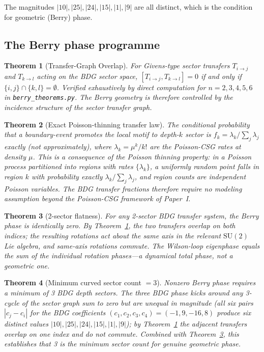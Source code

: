 \documentclass[11pt]{article}
\newtheorem{theorem}{Theorem}
\begin{document}
The magnitudes $|10|,|25|,|24|,|15|,|1|,|9|$ are all distinct, which is the condition for geometric (Berry) phase.

\subsection{The Berry phase programme}

\begin{theorem}[Transfer-Graph Overlap]
\label{thm:overlap}
For Givens-type sector transfers $T_{i\to j}$ and $T_{k\to l}$ acting on the BDG sector space, $[T_{i\to j},T_{k\to l}]=0$ if and only if $\{i,j\}\cap\{k,l\}=\emptyset$. Verified exhaustively by direct computation for $n=2,3,4,5,6$ in \texttt{berry\_theorems.py}. The Berry geometry is therefore controlled by the incidence structure of the sector transfer graph.
\end{theorem}

\begin{theorem}[Exact Poisson-thinning transfer law]
\label{thm:thinning}
The conditional probability that a boundary-event promotes the local motif to depth-$k$ sector is $f_k=\lambda_k/\sum_j\lambda_j$ exactly (not approximately), where $\lambda_k=\mu^k/k!$ are the Poisson-CSG rates at density $\mu$. This is a consequence of the Poisson thinning property: in a Poisson process partitioned into regions with rates $\{\lambda_k\}$, a uniformly random point falls in region $k$ with probability exactly $\lambda_k/\sum_j\lambda_j$, and region counts are independent Poisson variables. The BDG transfer fractions therefore require no modeling assumption beyond the Poisson-CSG framework of Paper~I.
\end{theorem}

\begin{theorem}[2-sector flatness]
\label{thm:2sector}
For any 2-sector BDG transfer system, the Berry phase is identically zero. By Theorem~\ref{thm:overlap}, the two transfers overlap on both indices; the resulting rotations act about the same axis in the relevant $\mathrm{SU}(2)$ Lie algebra, and same-axis rotations commute. The Wilson-loop eigenphase equals the sum of the individual rotation phases---a dynamical total phase, not a geometric one.
\end{theorem}

\begin{theorem}[Minimum curved sector count $=3$]
\label{thm:min3}
Nonzero Berry phase requires a minimum of 3 BDG depth sectors. The three BDG phase kicks around any 3-cycle of the sector graph sum to zero but are unequal in magnitude (all six pairs $|c_{j}-c_i|$ for the BDG coefficients $(c_1,c_2,c_3,c_4)=(-1,9,-16,8)$ produce six distinct values $|10|,|25|,|24|,|15|,|1|,|9|$); by Theorem~\ref{thm:overlap} the adjacent transfers overlap on one index and do not commute. Combined with Theorem~\ref{thm:2sector}, this establishes that 3 is the minimum sector count for genuine geometric phase.
\end{theorem}
\end{document}
